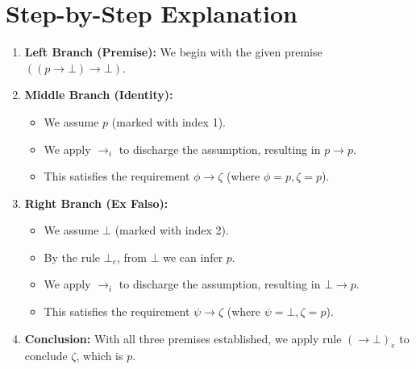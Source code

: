 \documentclass[a4paper,12pt]{article}
\begin{document}
\vspace{1cm}

\begin{center}
\EnableBpAbbreviations



\end{center}

\vspace{1cm}

\section*{Step-by-Step Explanation}

\begin{enumerate}
    \item \textbf{Left Branch (Premise):} We begin with the given premise $((p \to \bot) \to \bot)$.
    
    \item \textbf{Middle Branch (Identity):} 
    \begin{itemize}
        \item We assume $p$ (marked with index 1).
        \item We apply $\to_i$ to discharge the assumption, resulting in $p \to p$.
        \item This satisfies the requirement $\phi \to \zeta$ (where $\phi=p, \zeta=p$).
    \end{itemize}
    
    \item \textbf{Right Branch (Ex Falso):} 
    \begin{itemize}
        \item We assume $\bot$ (marked with index 2).
        \item By the rule $\bot_e$, from $\bot$ we can infer $p$.
        \item We apply $\to_i$ to discharge the assumption, resulting in $\bot \to p$.
        \item This satisfies the requirement $\psi \to \zeta$ (where $\psi=\bot, \zeta=p$).
    \end{itemize}

    \item \textbf{Conclusion:} 
    With all three premises established, we apply rule $(\to \bot)_e$ to conclude $\zeta$, which is $p$.
\end{enumerate}
\end{document}
